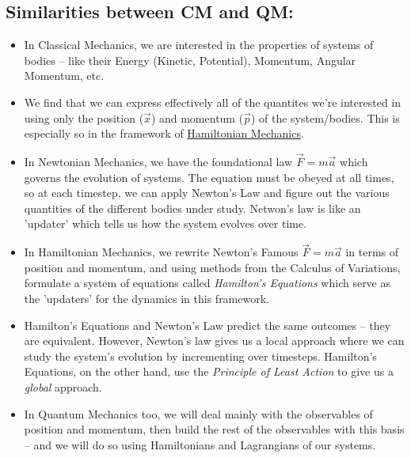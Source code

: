 \documentclass[twoside]{article}
\begin{document}
\subsection*{Similarities between CM and QM:}
\begin{itemize}
   \item In Classical Mechanics, we are interested in the properties of systems of bodies -- like their Energy (Kinetic, Potential), Momentum, Angular Momentum, etc. 

   \item We find that we can express effectively all of the quantites we're interested in using only the position ($\vec{x}$) and momentum ($\vec{p}$) of the system/bodies. This is especially so in the framework of \underline{Hamiltonian Mechanics}.

   \item In Newtonian Mechanics, we have the foundational law $\vec{F} = m\vec{a}$ which governs the evolution of systems. The equation must be obeyed at all times, so at each timestep, we can apply Newton's Law and figure out the various quantities of the different bodies under study. Netwon's law is like an 'updater' which tells us how the system evolves over time.

   \item In Hamiltonian Mechanics, we rewrite Newton's Famous $\vec{F} = m\vec{a}$ in terms of position and momentum, and using methods from the Calculus of Variations, formulate a system of equations called \emph{Hamilton's Equations} which serve as the 'updaters' for the dynamics in this framework.

   \item Hamilton's Equations and Newton's Law predict the same outcomes -- they are equivalent. However, Newton's law gives us a local approach where we can study the system's evolution by incrementing over timesteps. Hamilton's Equations, on the other hand, use the \emph{Principle of Least Action} to give us a \emph{global} approach. 

   \item In Quantum Mechanics too, we will deal mainly with the observables of position and momentum, then build the rest of the observables with this basis -- and we will do so using Hamiltonians and Lagrangians of our systems.
\end{itemize}
\end{document}
